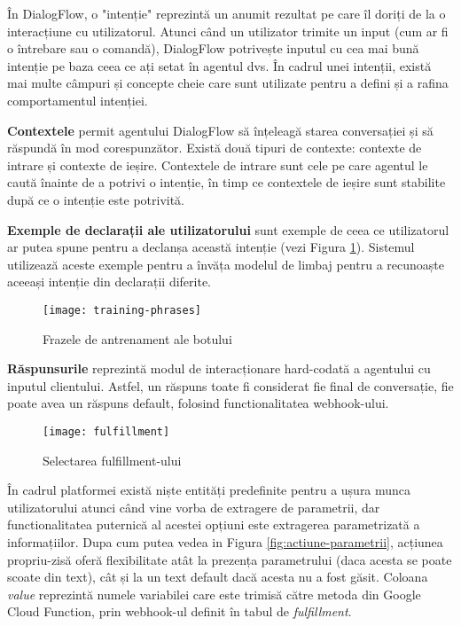 În DialogFlow, o "intenție" reprezintă un anumit rezultat pe care îl doriți de la o interacțiune cu utilizatorul. Atunci când un utilizator trimite un input (cum ar fi o întrebare sau o comandă), DialogFlow potrivește inputul cu cea mai bună intenție pe baza ceea ce ați setat în agentul dvs. În cadrul unei intenții, există mai multe câmpuri și concepte cheie care sunt utilizate pentru a defini și a rafina comportamentul intenției.

\textbf{Contextele} permit agentului DialogFlow să înțeleagă starea conversației și să răspundă în mod corespunzător. Există două tipuri de contexte: contexte de intrare și contexte de ieșire. Contextele de intrare sunt cele pe care agentul le caută înainte de a potrivi o intenție, în timp ce contextele de ieșire sunt stabilite după ce o intenție este potrivită.

\textbf{Exemple de declarații ale utilizatorului} sunt exemple de ceea ce utilizatorul ar putea spune pentru a declanșa această intenție (vezi Figura \ref{fig:training-phrases}). Sistemul utilizează aceste exemple pentru a învăța modelul de limbaj pentru a recunoaște aceeași intenție din declarații diferite.

\begin{figure}[H]
    \centering
    \texttt{[image: training-phrases]}
    \caption{Frazele de antrenament ale botului}
    \label{fig:training-phrases}
\end{figure}

\textbf{Răspunsurile} reprezintă modul de interacționare hard-codată a agentului cu inputul clientului. Astfel, un răspuns toate fi considerat fie final de conversație, fie poate avea un răspuns default, folosind functionalitatea webhook-ului.

\begin{figure}[H]
    \centering
    \texttt{[image: fulfillment]}
    \caption{Selectarea fulfillment-ului}
    \label{fig:fulfillment}
\end{figure}

În cadrul platformei există niște entități predefinite \cite{system-entities} pentru a ușura munca utilizatorului atunci când vine vorba de extragere de parametrii, dar functionalitatea puternică al acestei opțiuni este extragerea parametrizată a informațiilor. Dupa cum putea vedea in Figura \ref{fig:actiune-parametrii}, acțiunea propriu-zisă oferă flexibilitate atât la prezența parametrului (daca acesta se poate scoate din text), cât și la un text default dacă acesta nu a fost găsit. Coloana \emph{value} reprezintă numele variabilei care este trimisă către metoda din Google Cloud Function, prin webhook-ul definit în tabul de \emph{fulfillment}.


